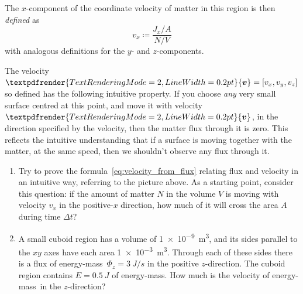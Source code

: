 \documentclass[a4paper,12pt,%
onecolumn,oneside,%
british%
]{memoir}
\renewcommand*{\bm}[1]{\textpdfrender{TextRenderingMode=2,LineWidth=0.2pt}{\boldsymbol{#1}}}
\newcommand*{\incr}{\Delta}%
\newcommand*{\defd}{\coloneqq}
\renewcommand*{\|}[1][]{\nonscript\:#1\vert\nonscript\:\mathopen{}}
\newcommand*{\energym}{energy-mass}
\newcommand*{\yv}{\bm{v}}
\newcommand*{\Dt}{\incr t}
\newcommand*{\yN}{N}
\newcommand*{\yE}{E}
\newcommand*{\yH}{\varPhi}%
\begin{document}
The $x$-component of the coordinate velocity of matter in this region is then \emph{defined} as
\begin{equation}
  \label{eq:velocity_from_flux}
  v_{x} \defd \frac{J_{x}/A}{\yN/V}
\end{equation}
with analogous definitions for the $y$- and $z$-components.


The velocity $\yv=[v_{x}, v_{y}, v_{z}]$ so defined has the following intuitive property. If you choose \emph{any} very small surface centred at this point, and move it with velocity $\yv$, in the direction specified by the velocity, then the matter flux through it is zero. This reflects the intuitive understanding that if a surface is moving together with the matter, at the same speed, then we shouldn't observe any flux through it.

\begin{exercise}
  \begin{enumerate}[exerc]
  \item Try to prove the formula~\eqref{eq:velocity_from_flux} relating flux and velocity in an intuitive way, referring to the picture above. As a starting point, consider this question: if the amount of matter $\yN$ in the volume $V$ is moving with velocity $v_{x}$ in the positive-$x$ direction, how much of it will cross the area $A$ during time $\Dt$?

  \item A small cuboid region has a volume of \qty[print-unity-mantissa]{1e-9}{m^3}, and its sides parallel to the $xy$ axes have each area \qty[print-unity-mantissa]{1e-3}{m^3}. Through each of these sides there is a flux of \energym\ $\yH_{z} = \qty{3}{J/s}$ in the positive $z$-direction. The cuboid region contains $\yE = \qty{0.5}{J}$ of \energym. How much is the velocity of \energym\ in the $z$-direction?
  \end{enumerate}
\end{exercise}

\medskip
\end{document}
